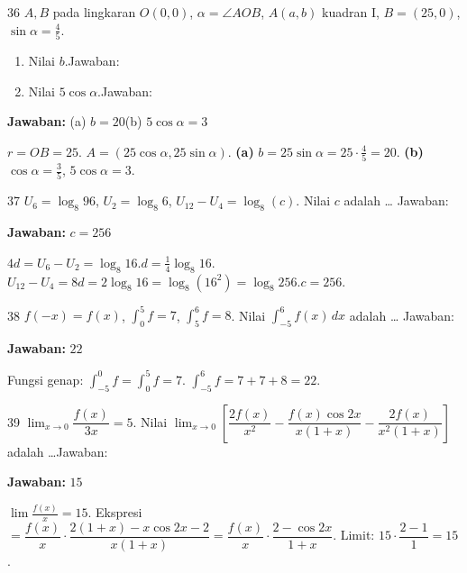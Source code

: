 \documentclass[11pt]{article}
\newcommand{\jawaban}[1]{%
  \noindent\colorbox{gold!30}{\parbox{\dimexpr\linewidth-2\fboxsep\relax}{%
    \textbf{Jawaban:} #1}}\par\smallskip}
\begin{document}
\begin{soal}{36}
$A,B$ pada lingkaran $O(0,0)$, $\alpha=\angle AOB$, $A(a,b)$ kuadran I, $B=(25,0)$,
$\sin\alpha=\tfrac{4}{5}$.
\begin{enumerate}[label=(\alph*),leftmargin=*,topsep=3pt,itemsep=3pt]
  \item Nilai $b$.\hfill Jawaban:\enspace\underline{\hspace{3.5cm}}
  \item Nilai $5\cos\alpha$.\hfill Jawaban:\enspace\underline{\hspace{3.5cm}}
\end{enumerate}
\end{soal}
\begin{pembox}
\jawaban{(a) $b=20$\quad(b) $5\cos\alpha=3$}
$r=OB=25$. $A=(25\cos\alpha,25\sin\alpha)$.
\textbf{(a)} $b=25\sin\alpha=25\cdot\tfrac45=20$.
\textbf{(b)} $\cos\alpha=\tfrac35$, $5\cos\alpha=3$.
\end{pembox}

\begin{soal}{37}
$U_6=\log_8 96$, $U_2=\log_8 6$, $U_{12}-U_4=\log_8(c)$. Nilai $c$ adalah \ldots\hfill
Jawaban:\enspace\underline{\hspace{3cm}}
\end{soal}
\begin{pembox}
\jawaban{$c=256$}
$4d=U_6-U_2=\log_8 16$.\quad$d=\tfrac14\log_8 16$.
$U_{12}-U_4=8d=2\log_8 16=\log_8(16^2)=\log_8 256$.\quad$c=256$.
\end{pembox}

\begin{soal}{38}
$f(-x)=f(x)$, $\int_0^5 f=7$, $\int_5^6 f=8$.
Nilai $\displaystyle\int_{-5}^6 f(x)\,dx$ adalah \ldots\hfill
Jawaban:\enspace\underline{\hspace{3cm}}
\end{soal}
\begin{pembox}
\jawaban{$22$}
Fungsi genap: $\int_{-5}^0 f=\int_0^5 f=7$.
$\int_{-5}^6 f=7+7+8=22$.
\end{pembox}

\begin{soal}{39}
$\displaystyle\lim_{x\to0}\dfrac{f(x)}{3x}=5$. Nilai
$\displaystyle\lim_{x\to0}\!\left[\dfrac{2f(x)}{x^2}-\dfrac{f(x)\cos2x}{x(1+x)}-\dfrac{2f(x)}{x^2(1+x)}\right]$
adalah \ldots\hfill Jawaban:\enspace\underline{\hspace{2.5cm}}
\end{soal}
\begin{pembox}
\jawaban{$15$}
$\lim\tfrac{f(x)}{x}=15$. Ekspresi $=\dfrac{f(x)}{x}\cdot\dfrac{2(1+x)-x\cos2x-2}{x(1+x)}
=\dfrac{f(x)}{x}\cdot\dfrac{2-\cos2x}{1+x}$.
Limit: $15\cdot\dfrac{2-1}{1}=15$.
\end{pembox}
\end{document}
